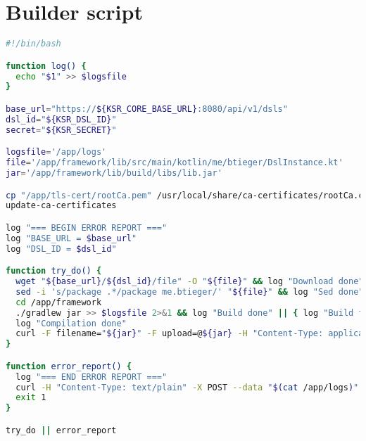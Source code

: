\begin{lstlisting}[caption={TODO},language=bash,label=appendix:YAML]

\end{lstlisting}

\begin{lstlisting}[caption={TODO},language=bash,label=appendix:YAML]

\end{lstlisting}

\clearpage\section{Builder script}

\begin{lstlisting}[caption={Builder script},language=bash,label=appendix:builder]
#!/bin/bash

function log() {
  echo "$1" >> $logsfile
}

base_url="https://${KSR_CORE_BASE_URL}:8080/api/v1/dsls"
dsl_id="${KSR_DSL_ID}"
secret="${KSR_SECRET}"

logsfile='/app/logs'
file='/app/framework/lib/src/main/kotlin/me/btieger/DslInstance.kt'
jar='/app/framework/lib/build/libs/lib.jar'

cp "/app/tls-cert/rootCa.pem" /usr/local/share/ca-certificates/rootCa.crt
update-ca-certificates

log "=== BEGIN ERROR REPORT ==="
log "BASE_URL = $base_url"
log "DSL_ID = $dsl_id"

function try_do() {
  wget "${base_url}/${dsl_id}/file" -O "${file}" && log "Download done" || { log "Download failed" && error_report; }
  sed -i 's/package .*/package me.btieger/' "${file}" && log "Sed done" || { log "Sed failed" && error_report; }
  cd /app/framework
  ./gradlew jar >> $logsfile 2>&1 && log "Build done" || { log "Build failed" && error_report; }
  log "Compilation done"
  curl -F filename="${jar}" -F upload=@${jar} -H "Content-Type: application/java-archive" "${base_url}/${dsl_id}/jar" || { log "Upload failed" && error_report; }
}

function error_report() {
  log "=== END ERROR REPORT ==="
  curl -H "Content-Type: text/plain" -X POST --data "$(cat /app/logs)" "${base_url}/${dsl_id}/jar"
  exit 1
}

try_do || error_report
\end{lstlisting}

